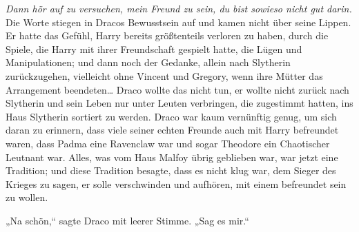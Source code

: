 \emph{Dann hör auf zu versuchen, mein Freund zu sein, du bist sowieso nicht gut darin.}
Die Worte stiegen in Dracos Bewusstsein auf und kamen nicht über seine Lippen. Er hatte das Gefühl, Harry bereits größtenteils verloren zu haben, durch die Spiele, die Harry mit ihrer Freundschaft gespielt hatte, die Lügen und Manipulationen; und dann noch der Gedanke, allein nach Slytherin zurückzugehen, vielleicht ohne Vincent und Gregory, wenn ihre Mütter das Arrangement beendeten… Draco wollte das nicht tun, er wollte nicht zurück nach Slytherin und sein Leben nur unter Leuten verbringen, die zugestimmt hatten, ins Haus Slytherin sortiert zu werden.
Draco war kaum vernünftig genug, um sich daran zu erinnern, dass viele seiner echten Freunde auch mit Harry befreundet waren, dass Padma eine Ravenclaw war und sogar Theodore ein Chaotischer Leutnant war. Alles, was vom Haus Malfoy übrig geblieben war, war jetzt eine Tradition; und diese Tradition besagte, dass es nicht klug war, dem Sieger des Krieges zu sagen, er solle verschwinden und aufhören, mit einem befreundet sein zu wollen.

„Na schön,“ sagte Draco mit leerer Stimme. „Sag es mir.“


